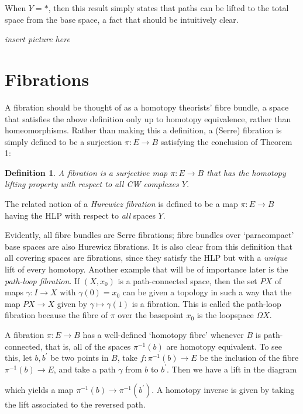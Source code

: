 \documentclass[11pt]{article}
\newcommand{\inv}{^{-1}}
\newcommand{\dash}{^{\prime}}
\newtheorem{definition}{Definition}
\begin{document}
When $Y = \ast$, then this result simply states that paths can be lifted to the total space from the base space, a fact that should be intuitively clear.
\begin{center}
\textit{insert picture here}
\end{center}

\section*{Fibrations}

A fibration should be thought of as a homotopy theorists' fibre bundle, a space that satisfies the above definition only up to homotopy equivalence, rather than homeomorphisms. Rather than making this a definition, a (Serre) fibration is simply defined to be a surjection $\pi: E \to B$ satisfying the conclusion of Theorem 1:
\begin{definition}
A fibration is a surjective map $\pi: E \to B$  that has the homotopy lifting property with respect to all CW complexes $Y$. 
\end{definition}
The related notion of a \textit{Hurewicz fibration} is defined to be a map $\pi : E \to B$ having the HLP with respect to \textit{all} spaces $Y$. 

Evidently, all fibre bundles are Serre fibrations; fibre bundles over `paracompact' base spaces are also Hurewicz fibrations. It is also clear from this definition that all covering spaces are fibrations, since they satisfy the HLP but with a \textit{unique} lift of every homotopy. Another example that will be of importance later is the \textit{path-loop fibration}. If $(X,x_0)$ is a path-connected space, then the set $PX$ of maps $\gamma: I \to X$ with $\gamma(0) = x_0$ can be given a topology in such a way that the map $PX \to X$ given by $\gamma \mapsto \gamma(1)$ is a fibration. This is called the path-loop fibration because the fibre of $\pi$ over the basepoint $x_0$ is the loopspace $\Omega X$.

A fibration $\pi: E \to B$ has a well-defined `homotopy fibre' whenever $B$ is path-connected, that is, all of the spaces $\pi^{-1}(b)$ are homotopy equivalent. To see this, let $b, b\dash$ be two points in $B$, take $f: \pi\inv(b) \to E$ be the inclusion of the fibre $\pi^{-1}(b) \to E$, and take a path $\gamma$ from $b$ to $b\dash$. Then we have a lift in the diagram
\begin{center}
\end{center}
which yields a map $\pi\inv(b) \to \pi\inv(b\dash)$. A homotopy inverse is given by taking the lift associated to the reversed path.
\end{document}
